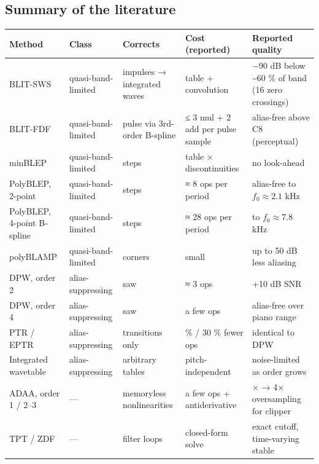 \documentclass[conference]{IEEEtran}
\begin{document}
\setcounter{subsection}{9}
\subsection{Summary of the literature}
\begin{table}[t]
\centering\footnotesize
\begin{tabularx}{\textwidth}{@{}>{\raggedright\arraybackslash}Xl>{\raggedright\arraybackslash}X>{\raggedright\arraybackslash}X>{\raggedright\arraybackslash}X@{}}
\toprule
\textbf{Method} & \textbf{Class} & \textbf{Corrects} & \textbf{Cost (reported)} & \textbf{Reported quality} \\
\midrule
BLIT-SWS \cite{r32} & quasi-band-limited & impulses → integrated waves & table + convolution & −90 dB below \textasciitilde{}60 \% of band (16 zero crossings) \\
BLIT-FDF \cite{r23} & quasi-band-limited & pulse via 3rd-order B-spline & ≤ 3 mul + 2 add per pulse sample & alias-free above C8 (perceptual) \\
minBLEP \cite{r4} & quasi-band-limited & steps & table × discontinuities & no look-ahead \\
PolyBLEP, 2-point \cite{r38,r40} & quasi-band-limited & steps & ≈ 8 ops per period & alias-free to $f_0 \approx 2.1$ kHz \\
PolyBLEP, 4-point B-spline \cite{r40} & quasi-band-limited & steps & ≈ 28 ops per period & to $f_0 \approx 7.8$ kHz \\
polyBLAMP \cite{r11,r9} & quasi-band-limited & corners & small & up to 50 dB less aliasing \\
DPW, order 2 \cite{r36} & alias-suppressing & saw & ≈ 3 ops & +10 dB SNR \\
DPW, order 4 \cite{r39} & alias-suppressing & saw & a few ops & alias-free over piano range \\
PTR / EPTR \cite{r19,r1} & alias-suppressing & transitions only & 40 \% / 30 \% fewer ops & identical to DPW \\
Integrated wavetable \cite{r14,r13} & alias-suppressing & arbitrary tables & pitch-independent & noise-limited as order grows \\
ADAA, order 1 / 2–3 \cite{r25,r3} & — & memoryless nonlinearities & a few ops + antiderivative & 12× → 4× oversampling for clipper \\
TPT / ZDF \cite{r42,r30,r41} & — & filter loops & closed-form solve & exact cutoff, time-varying stable \\
\bottomrule
\end{tabularx}
\end{table}
\end{document}
